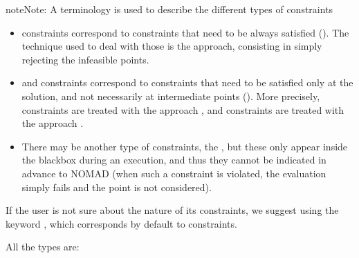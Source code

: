 \documentclass[letterpaper,10pt,english]{sphinxmanual}
\begin{document}
\begin{sphinxadmonition}{note}{Note:}
\sphinxAtStartPar
A terminology is used to describe the different types of constraints 
\begin{itemize}
\item {} 
\sphinxAtStartPar
{} constraints correspond to constraints that need to be always satisfied (). The technique used to deal with those is the  approach, consisting in simply rejecting the  infeasible points.

\item {} 
\sphinxAtStartPar
{} and  constraints correspond to constraints that need to be satisfied only at the solution, and not necessarily at intermediate points (). More precisely,  constraints are treated with the  approach ,  and  constraints are treated with the   approach .

\item {} 
\sphinxAtStartPar
There may be another type of constraints, the , but these only  appear inside the blackbox during an execution, and thus they   cannot be indicated in advance to NOMAD  (when such a constraint is violated, the evaluation simply fails and the point  is not considered).

\end{itemize}

\sphinxAtStartPar
If the user is not sure about the nature of its constraints, we suggest using the keyword , which corresponds by default to  constraints.
\end{sphinxadmonition}

\sphinxAtStartPar
All the types are:
\end{document}
